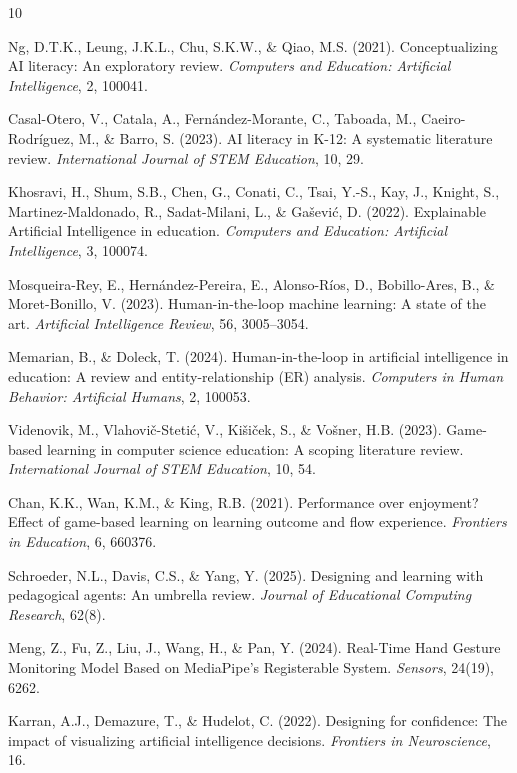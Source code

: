 \begin{thebibliography}{10}

Ng, D.T.K., Leung, J.K.L., Chu, S.K.W., \& Qiao, M.S. (2021). Conceptualizing AI literacy: An exploratory review. \textit{Computers and Education: Artificial Intelligence}, 2, 100041.

Casal-Otero, V., Catala, A., Fern\'andez-Morante, C., Taboada, M., Caeiro-Rodr\'iguez, M., \& Barro, S. (2023). AI literacy in K-12: A systematic literature review. \textit{International Journal of STEM Education}, 10, 29.

Khosravi, H., Shum, S.B., Chen, G., Conati, C., Tsai, Y.-S., Kay, J., Knight, S., Martinez-Maldonado, R., Sadat-Milani, L., \& Ga\v{s}evi\'c, D. (2022). Explainable Artificial Intelligence in education. \textit{Computers and Education: Artificial Intelligence}, 3, 100074.

Mosqueira-Rey, E., Hern\'andez-Pereira, E., Alonso-R\'ios, D., Bobillo-Ares, B., \& Moret-Bonillo, V. (2023). Human-in-the-loop machine learning: A state of the art. \textit{Artificial Intelligence Review}, 56, 3005--3054.

Memarian, B., \& Doleck, T. (2024). Human-in-the-loop in artificial intelligence in education: A review and entity-relationship (ER) analysis. \textit{Computers in Human Behavior: Artificial Humans}, 2, 100053.

Videnovik, M., Vlahovi\v{c}-Steti\'c, V., Kišiček, S., \& Vošner, H.B. (2023). Game-based learning in computer science education: A scoping literature review. \textit{International Journal of STEM Education}, 10, 54.

Chan, K.K., Wan, K.M., \& King, R.B. (2021). Performance over enjoyment? Effect of game-based learning on learning outcome and flow experience. \textit{Frontiers in Education}, 6, 660376.

Schroeder, N.L., Davis, C.S., \& Yang, Y. (2025). Designing and learning with pedagogical agents: An umbrella review. \textit{Journal of Educational Computing Research}, 62(8).

Meng, Z., Fu, Z., Liu, J., Wang, H., \& Pan, Y. (2024). Real-Time Hand Gesture Monitoring Model Based on MediaPipe's Registerable System. \textit{Sensors}, 24(19), 6262.

Karran, A.J., Demazure, T., \& Hudelot, C. (2022). Designing for confidence: The impact of visualizing artificial intelligence decisions. \textit{Frontiers in Neuroscience}, 16.

\end{thebibliography}
